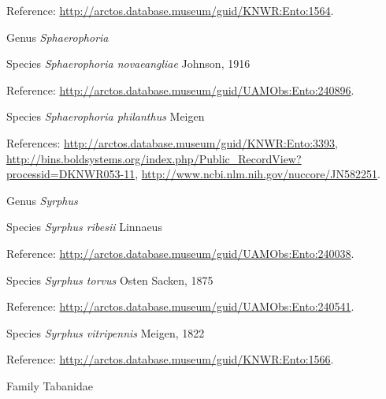 \documentclass[9pt, article]{memoir}
\begin{document}
\begin{multicols}{2}
\vspace{6pt}Reference: 
\url{http://arctos.database.museum/guid/KNWR:Ento:1564}.

\vspace{6pt}\noindent\hspace{30pt}Genus \textit{Sphaerophoria}


\vspace{6pt}\noindent\hspace{36pt}Species \textit{Sphaerophoria novaeangliae} Johnson, 1916


\vspace{6pt}Reference: 
\url{http://arctos.database.museum/guid/UAMObs:Ento:240896}.

\vspace{6pt}\noindent\hspace{36pt}Species \textit{Sphaerophoria philanthus} Meigen


\vspace{6pt}References: 
\url{http://arctos.database.museum/guid/KNWR:Ento:3393}, 
\url{http://bins.boldsystems.org/index.php/Public_RecordView?processid=DKNWR053-11}, 
\url{http://www.ncbi.nlm.nih.gov/nuccore/JN582251}.

\vspace{6pt}\noindent\hspace{30pt}Genus \textit{Syrphus}


\vspace{6pt}\noindent\hspace{36pt}Species \textit{Syrphus ribesii} Linnaeus


\vspace{6pt}Reference: 
\url{http://arctos.database.museum/guid/UAMObs:Ento:240038}.

\vspace{6pt}\noindent\hspace{36pt}Species \textit{Syrphus torvus} Osten Sacken, 1875


\vspace{6pt}Reference: 
\url{http://arctos.database.museum/guid/UAMObs:Ento:240541}.

\vspace{6pt}\noindent\hspace{36pt}Species \textit{Syrphus vitripennis} Meigen, 1822


\vspace{6pt}Reference: 
\url{http://arctos.database.museum/guid/KNWR:Ento:1566}.

\vspace{6pt}\noindent\hspace{24pt}Family Tabanidae



\end{multicols}
\end{document}
